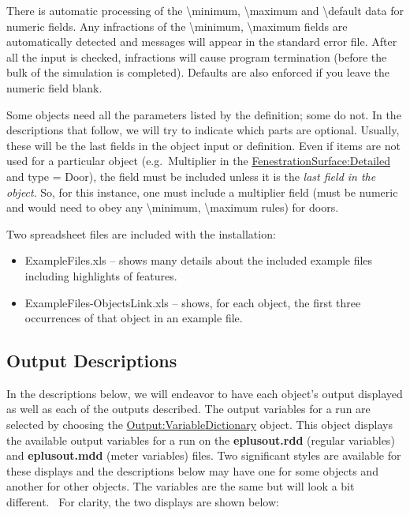 There is automatic processing of the \textbackslash{}minimum, \textbackslash{}maximum and \textbackslash{}default data for numeric fields. Any infractions of the \textbackslash{}minimum, \textbackslash{}maximum fields are automatically detected and messages will appear in the standard error file. After all the input is checked, infractions will cause program termination (before the bulk of the simulation is completed). Defaults are also enforced if you leave the numeric field blank.

Some objects need all the parameters listed by the definition; some do not. In the descriptions that follow, we will try to indicate which parts are optional. Usually, these will be the last fields in the object input or definition. Even if items are not used for a particular object (e.g.~Multiplier in the \hyperref[fenestrationsurfacedetailed]{FenestrationSurface:Detailed} and type = Door), the field must be included unless it is the \emph{last field in the object}. So, for this instance, one must include a multiplier field (must be numeric and would need to obey any \textbackslash{}minimum, \textbackslash{}maximum rules) for doors.

Two spreadsheet files are included with the installation:

\begin{itemize}
\item
  ExampleFiles.xls -- shows many details about the included example files including highlights of features.
\item
  ExampleFiles-ObjectsLink.xls -- shows, for each object, the first three occurrences of that object in an example file.
\end{itemize}

\subsection{Output Descriptions}\label{output-descriptions}

In the descriptions below, we will endeavor to have each object's output displayed as well as each of the outputs described. The output variables for a run are selected by choosing the \hyperref[output-variabledictionary]{\hyperref[outputvariable]{Output:Variable}Dictionary} object. This object displays the available output variables for a run on the \textbf{eplusout.rdd} (regular variables) and \textbf{eplusout.mdd} (meter variables) files. Two significant styles are available for these displays and the descriptions below may have one for some objects and another for other objects. The variables are the same but will look a bit different.~ For clarity, the two displays are shown below:

